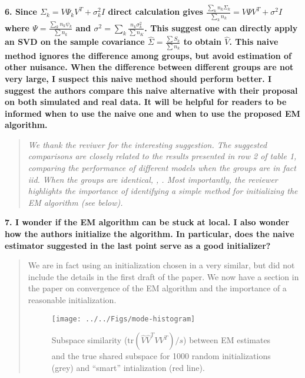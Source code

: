 \documentclass{article}
\newcommand{\tr}{\text{tr}}
\newenvironment{resp}{\begin{quotation}\noindent\slshape}{\end{quotation}}
\begin{document}
\noindent \textbf{6. Since $\Sigma_k = V\Psi_kV^T + \sigma^2_kI$ direct calculation gives
$\frac{\sum_k n_k\Sigma_k}{\sum_k n_k} = V\Psi V^T + \sigma^2I$ where $\Psi = \frac{\sum_k n_k \psi_k}{\sum n_k}$ and $\sigma^2 = \sum_k \frac{n_k \sigma_k^2}{\sum n_K}$.  This suggest one can directly apply an SVD on the sample covariance $\hat{\Sigma} = \frac{\sum S_k}{\sum n_k}$ to obtain $\hat{V}$. This naive method ignores the difference among groups, but avoid estimation of other nuisance. When the difference between different groups are not very large, I suspect this naive method should perform better. I suggest the authors compare this naive alternative with their proposal on both simulated and real data.  It will be helpful for readers to be informed when to use the naive one and when to use the proposed EM algorithm.}

\begin{resp}
We thank the reviwer for the interesting suggestion.  The suggested comparisons are closely related to the results presented in row 2 of table 1, comparing the performance of different models when the groups are in fact iid.  When the groups are identical, , .  Most importantly, the reviewer highlights the importance of identifying a simple method for initializing the EM algorithm (see below).
\end{resp}

\textbf{7. I wonder if the EM algorithm can be stuck at local. I also wonder how the authors initialize the algorithm. In particular, does the naive estimator suggested in the last point serve as a good initializer?}

\begin{resp}

We are in fact using an initialization chosen in a very similar, but did not include the details in the first draft of the paper.  We now have a section in the paper on convergence of the EM algorithm and the importance of a reasonable initialization.


\begin{figure}[t]
    \centering
    \texttt{[image: ../../Figs/mode-histogram]}
        \label{fig:modeHist}
    \caption{ Subspace similarity ($\tr(\hat{V}\hat{V}^TVV^T)/s$)
      between EM estimates and the true shared subspace for 1000 random initializations (grey) and ``smart'' intialization (red line).  }
\end{figure}
\end{resp}

\section{}
\end{document}
